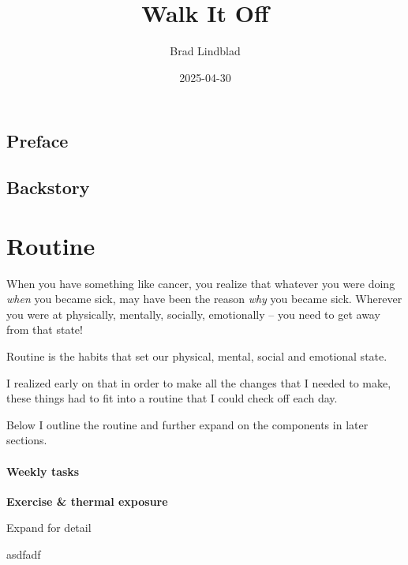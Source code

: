 \documentclass[
  letterpaper,
  DIV=11,
  numbers=noendperiod]{scrreprt}
\title{Walk It Off}
\author{Brad Lindblad}
\date{2025-04-30}
\renewcommand*\contentsname{Table of contents}
\newcommand\contentsname{Table of contents}
\begin{document}
\maketitle

\renewcommand*\contentsname{Table of contents}
{
\hypersetup{linkcolor=}
\setcounter{tocdepth}{2}
\tableofcontents
}

\chapter*{Preface}\label{preface}



\chapter{Backstory}\label{backstory}

\part{Routine}

When you have something like cancer, you realize that whatever you were
doing \emph{when} you became sick, may have been the reason \emph{why}
you became sick. Wherever you were at physically, mentally, socially,
emotionally -- you need to get away from that state!

Routine is the habits that set our physical, mental, social and
emotional state.

I realized early on that in order to make all the changes that I needed
to make, these things had to fit into a routine that I could check off
each day.

Below I outline the routine and further expand on the components in
later sections.

\subsection*{Weekly tasks}\label{weekly-tasks}

\textbf{Exercise \& thermal exposure}

Expand for detail

asdfadf
\end{document}
